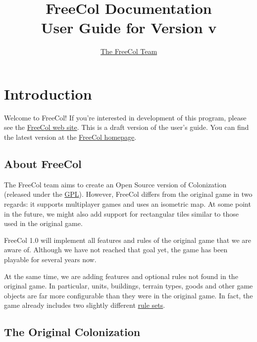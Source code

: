 \documentclass[12pt]{book}
\begin{document}
\author{\href{http://freecol.sourceforge.net/index.php?section=8}{The FreeCol Team}}
\title{FreeCol Documentation\\User Guide for Version v\fcversion}
\maketitle{}

\tableofcontents
\newpage


\hypertarget{Introduction}{\chapter{Introduction}}

Welcome to FreeCol! If you're interested in development of this
program, please see the \href{http://freecol.sourceforge.net}{FreeCol
web site}. This is a draft version of the user's guide. You can find
the latest version at the
\href{http://freecol.sourceforge.net}{FreeCol homepage}.

\hypertarget{About FreeCol}{\section{About FreeCol}}

The FreeCol team aims to create an Open Source version of Colonization
(released under the \href{http://www.gnu.org/licenses/gpl.html}{GPL}).
However, FreeCol differs from the original game in two regards: it
supports multiplayer games and uses an isometric map. At some point in
the future, we might also add support for rectangular tiles similar to
those used in the original game.

FreeCol 1.0 will implement all features and rules of the original game
that we are aware of. Although we have not reached that goal yet, the
game has been playable for several years now.

At the same time, we are adding features and optional rules not found
in the original game. In particular, units, buildings, terrain types,
goods and other game objects are far more configurable than they were
in the original game. In fact, the game already includes two slightly
different \hyperlink{About this manual}{rule sets}.


\hypertarget{The Original Colonization}{\section{The Original Colonization}}
\end{document}
